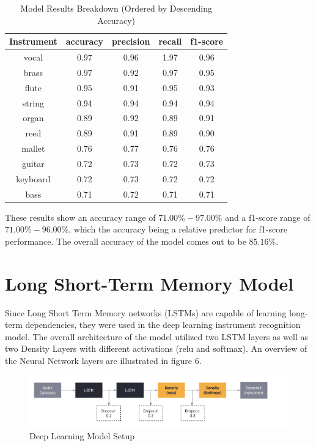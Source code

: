 \documentclass{article}
\begin{document}
\begin{table}[htb]
  \caption{Model Results Breakdown (Ordered by Descending Accuracy)}
  \label{results-table}
  \centering
  \begin{tabular}{ccccc}
    \toprule
    Instrument & accuracy & precision & recall & f1-score  \\
    \midrule
    vocal & 0.97 & 0.96 & 1.97 & 0.96\\
    brass & 0.97 & 0.92 & 0.97 & 0.95\\
    flute & 0.95 & 0.91 & 0.95 & 0.93\\
    string & 0.94 & 0.94 & 0.94 & 0.94\\
    organ & 0.89 & 0.92 & 0.89 & 0.91\\
    reed & 0.89 & 0.91 & 0.89 & 0.90\\
    mallet & 0.76 & 0.77 & 0.76 & 0.76\\
    guitar & 0.72 & 0.73 & 0.72 & 0.73\\
    keyboard & 0.72 & 0.73 & 0.72 & 0.72\\
    bass & 0.71 & 0.72 & 0.71 & 0.71\\
    \bottomrule
  \end{tabular}
\end{table}

These results show an accuracy range of $71.00\%-97.00\%$ and a f1-score range of $71.00\%-96.00\%$, which the accuracy being a relative predictor for f1-score performance. The overall accuracy of the model comes out to be $85.16\%$.



\section{Long Short-Term Memory Model}

Since Long Short Term Memory networks (LSTMs) are capable of learning long-term dependencies, they were used in the deep learning instrument recognition model. The overall architecture of the model utilized two LSTM layers as well as two Density Layers with different activations (relu and softmax). An overview of the Neural Network layers are illustrated in figure 6.

\begin{figure}[htb]
  \centering
  \includegraphics[width=1.1\linewidth]{architecture}
  \caption{Deep Learning Model Setup}
\end{figure}
\end{document}
